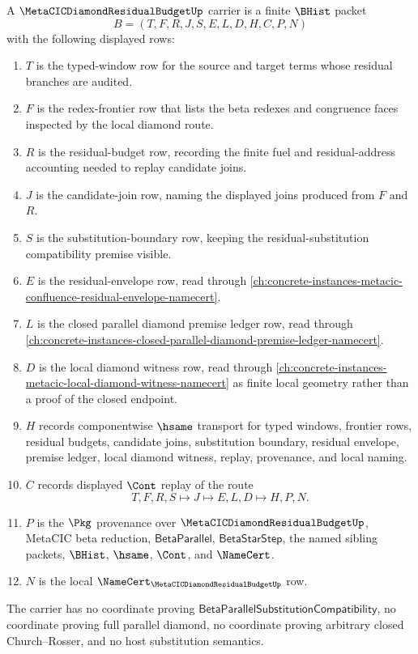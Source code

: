 \begin{definition}
\label{def:metacic-diamond-residual-budget-carrier}
A $\MetaCICDiamondResidualBudgetUp$ carrier is a finite $\BHist$ packet
$$
B=(T,F,R,J,S,E,L,D,H,C,P,N)
$$
with the following displayed rows:
\begin{enumerate}
\item $T$ is the typed-window row for the source and target terms whose residual branches are audited.
\item $F$ is the redex-frontier row that lists the beta redexes and congruence faces inspected by the local diamond route.
\item $R$ is the residual-budget row, recording the finite fuel and residual-address accounting needed to replay candidate joins.
\item $J$ is the candidate-join row, naming the displayed joins produced from $F$ and $R$.
\item $S$ is the substitution-boundary row, keeping the residual-substitution compatibility premise visible.
\item $E$ is the residual-envelope row, read through \autoref{ch:concrete-instances-metacic-confluence-residual-envelope-namecert}.
\item $L$ is the closed parallel diamond premise ledger row, read through \autoref{ch:concrete-instances-closed-parallel-diamond-premise-ledger-namecert}.
\item $D$ is the local diamond witness row, read through \autoref{ch:concrete-instances-metacic-local-diamond-witness-namecert} as finite local geometry rather than a proof of the closed endpoint.
\item $H$ records componentwise $\hsame$ transport for typed windows, frontier rows, residual budgets, candidate joins, substitution boundary, residual envelope, premise ledger, local diamond witness, replay, provenance, and local naming.
\item $C$ records displayed $\Cont$ replay of the route
$$
T,F,R,S \longmapsto J \longmapsto E,L,D \longmapsto H,P,N .
$$
\item $P$ is the $\Pkg$ provenance over $\MetaCICDiamondResidualBudgetUp$, MetaCIC beta reduction, $\mathsf{BetaParallel}$, $\mathsf{BetaStarStep}$, the named sibling packets, $\BHist$, $\hsame$, $\Cont$, and $\NameCert$.
\item $N$ is the local $\NameCert_{\MetaCICDiamondResidualBudgetUp}$ row.
\end{enumerate}
The carrier has no coordinate proving $\mathsf{BetaParallelSubstitutionCompatibility}$, no coordinate proving full parallel diamond, no coordinate proving arbitrary closed Church--Rosser, and no host substitution semantics.
\end{definition}


